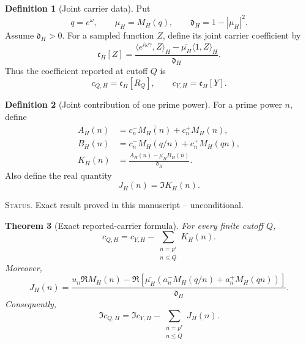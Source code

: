 \documentclass[11pt]{amsart}
\numberwithin{equation}{section}
\theoremstyle{plain}
\newtheorem{theorem}{Theorem}[section]
\theoremstyle{definition}
\newtheorem{definition}[theorem]{Definition}
\theoremstyle{remark}
\newcommand{\1}{\mathbf{1}}
\newcommand{\statusnote}[1]{%
  \par\smallskip\noindent
  \begingroup\footnotesize\textsc{Status.} #1\endgroup
  \par\smallskip}
\begin{document}
\begin{definition}[Joint carrier data]
\label{def:joint_carrier_data}
Put
\begin{equation}
q=e^\omega,
\qquad
\mu_H=M_H(q),
\qquad
\mathfrak d_H=1-|\mu_H|^2.
\label{eq:joint_carrier_data}
\end{equation}
Assume \(\mathfrak d_H>0\).  For a sampled function \(Z\), define its joint
carrier coefficient by
\begin{equation}
\mathfrak c_H[Z]
=
\frac{
\langle e^{i\omega\gamma},Z\rangle_H
-
\overline{\mu_H}\langle1,Z\rangle_H
}{
\mathfrak d_H
}.
\label{eq:joint_carrier_functional}
\end{equation}
Thus the coefficient reported at cutoff \(Q\) is
\begin{equation}
c_{Q,H}=\mathfrak c_H[R_Q],
\qquad
c_{Y,H}=\mathfrak c_H[Y].
\label{eq:joint_carrier_reported_definition}
\end{equation}
\end{definition}

\begin{definition}[Joint contribution of one prime power]
\label{def:joint_prime_increment}
For a prime power \(n\), define
\begin{align}
A_H(n)
&=
c_n^-\overline{M_H(n)}+c_n^+M_H(n),
\label{eq:joint_AH_definition}
\\
B_H(n)
&=
c_n^-M_H(q/n)+c_n^+M_H(qn),
\label{eq:joint_BH_definition}
\\
K_H(n)
&=
\frac{A_H(n)-\overline{\mu_H}B_H(n)}
{\mathfrak d_H}.
\label{eq:joint_KH_definition}
\end{align}
Also define the real quantity
\begin{equation}
J_H(n)
=
\Im K_H(n).
\label{eq:joint_JH_definition}
\end{equation}
\end{definition}

\statusnote{Exact result proved in this manuscript -- unconditional.}
\begin{theorem}[Exact reported-carrier formula]
\label{thm:exact_joint_carrier_formula}
For every finite cutoff \(Q\),
\begin{equation}
\boxed{
c_{Q,H}
=
c_{Y,H}
-
\sum_{\substack{n=p^r\\n\leq Q}}K_H(n).
}
\label{eq:exact_joint_carrier_formula}
\end{equation}
Moreover,
\begin{equation}
\boxed{
J_H(n)
=
\frac{
u_n\Re M_H(n)
-
\Re\!\left[
\overline{\mu_H}
\left(
a_n^-M_H(q/n)+a_n^+M_H(qn)
\right)
\right]
}{
\mathfrak d_H
}.
}
\label{eq:joint_JH_explicit}
\end{equation}
Consequently,
\begin{equation}
\boxed{
\Im c_{Q,H}
=
\Im c_{Y,H}
-
\sum_{\substack{n=p^r\\n\leq Q}}J_H(n).
}
\label{eq:exact_joint_imaginary_formula}
\end{equation}
\end{theorem}
\end{document}

